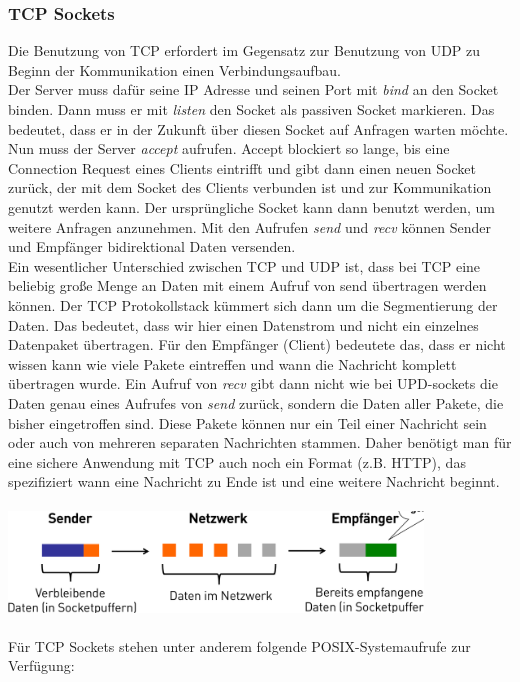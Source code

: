 \subsubsection{TCP Sockets}
Die Benutzung von TCP erfordert im Gegensatz zur Benutzung von UDP zu Beginn der Kommunikation einen Verbindungsaufbau.\\
Der Server muss dafür seine IP Adresse und seinen Port  mit \textit{bind} an den Socket binden. Dann muss er mit \textit{listen} den Socket als passiven Socket markieren. Das bedeutet, dass er in der Zukunft über diesen Socket auf Anfragen warten möchte. Nun muss der Server \textit{accept} aufrufen. Accept blockiert so lange, bis eine Connection Request eines Clients eintrifft und gibt dann einen neuen Socket zurück, der mit dem Socket des Clients verbunden ist und zur Kommunikation genutzt werden kann. Der ursprüngliche Socket kann dann benutzt werden, um weitere Anfragen anzunehmen. Mit den Aufrufen \textit{send} und \textit{recv} können Sender und Empfänger bidirektional Daten versenden.\\
Ein wesentlicher Unterschied zwischen TCP und UDP ist, dass bei TCP eine beliebig große Menge an Daten mit einem Aufruf von send übertragen werden können. Der TCP Protokollstack kümmert sich dann um die Segmentierung der Daten. Das bedeutet, dass wir hier einen Datenstrom und nicht ein einzelnes Datenpaket übertragen. Für den Empfänger (Client) bedeutete das, dass er nicht wissen kann wie viele Pakete eintreffen und wann die Nachricht komplett übertragen wurde. Ein Aufruf von \textit{recv} gibt dann nicht wie bei UPD-sockets die Daten genau eines Aufrufes von \textit{send} zurück, sondern die Daten aller Pakete, die bisher eingetroffen sind. Diese Pakete können nur ein Teil einer Nachricht sein oder auch von mehreren separaten Nachrichten stammen. Daher benötigt man für eine sichere Anwendung mit TCP auch noch ein Format (z.B. HTTP), das spezifiziert wann eine Nachricht zu Ende ist und eine weitere Nachricht beginnt.\\
\\
\includegraphics[width=11cm]{images/TCP_packets.png}
\\
\\
Für TCP Sockets stehen unter anderem folgende POSIX-Systemaufrufe zur Verfügung:
